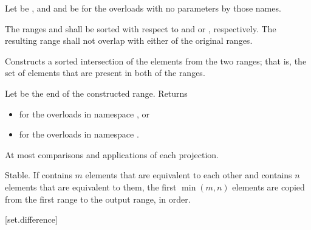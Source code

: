 \begin{itemdescr}
\pnum
Let  be ,
and  and  be 
for the overloads with no parameters by those names.

\pnum
\requires
The ranges  and  shall be
sorted with respect to  and
 or , respectively.
The resulting range shall not overlap with either of the original ranges.

\pnum
\effects
Constructs a sorted intersection of the elements from the two ranges;
that is, the set of elements that are present in both of the ranges.

\pnum
\returns
Let  be the end of the constructed range.
Returns
\begin{itemize}
\item {} for the overloads in namespace , or
\item {} for the overloads in
  namespace .
\end{itemize}

\pnum
\complexity
At most
comparisons and applications of each projection.

\pnum
\remarks
Stable.
If  contains $m$ elements that are equivalent to
each other and  contains $n$ elements that are equivalent
to them, the first $\min(m, n)$ elements are copied from the first range
to the output range, in order.
\end{itemdescr}

[set.difference]{}

